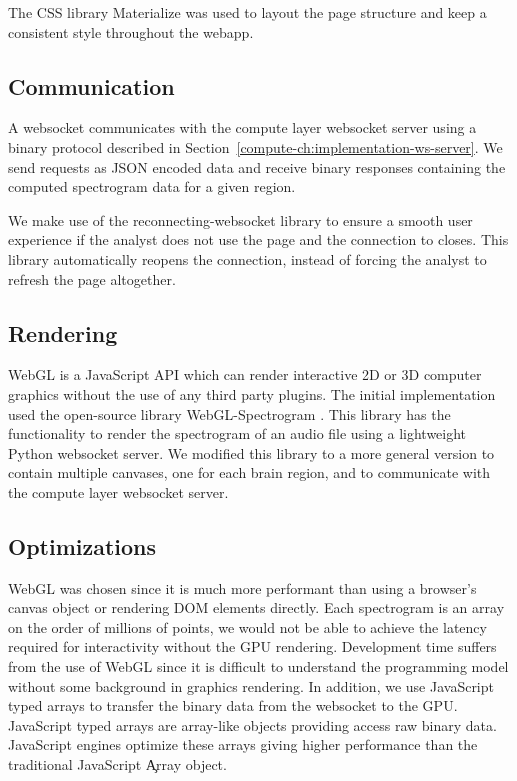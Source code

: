 The CSS library Materialize \cite{materialize} was used to layout the page
structure and keep a consistent style throughout the webapp.

\subsection{Communication}

A websocket communicates with the compute layer websocket server using a binary
protocol described in Section~\ref{compute-ch:implementation-ws-server}. We
send requests as JSON encoded data and receive binary responses containing the
computed spectrogram data for a given region.

We make use of the reconnecting-websocket \cite{reconnecting-websocket} library
to ensure a smooth user experience if the analyst does not use the page and the
connection to closes. This library automatically reopens the connection,
instead of forcing the analyst to refresh the page altogether.

\subsection{Rendering}

WebGL is a JavaScript API which can render interactive 2D or 3D computer
graphics without the use of any third party plugins. The initial implementation
used the open-source library WebGL-Spectrogram \cite{webgl-spectrogram}. This
library has the functionality to render the spectrogram of an audio file using a
lightweight Python websocket server. We modified this library to a more general
version to contain multiple canvases, one for each brain region, and to
communicate with the compute layer websocket server. \\

\subsection{Optimizations}

WebGL was chosen since it is much more performant than using a browser's canvas
object or rendering DOM elements directly. Each spectrogram is an array on the
order of millions of points, we would not be able to achieve the latency
required for interactivity without the GPU rendering. Development time suffers
from the use of WebGL since it is difficult to understand the programming model
without some background in graphics rendering. In addition, we use JavaScript
typed arrays to transfer the binary data from the websocket to the GPU.
JavaScript typed arrays are array-like objects providing access raw binary
data. JavaScript engines optimize these arrays giving higher performance than
the traditional JavaScript \c{Array} object.

